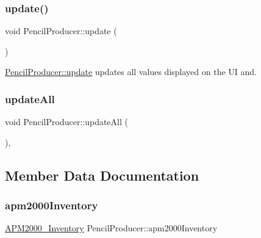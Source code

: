 \subsubsection{\texorpdfstring{update()}{update()}}
{\footnotesize\ttfamily void Pencil\+Producer\+::update (\begin{DoxyParamCaption}{ }\end{DoxyParamCaption})\hspace{0.3cm}{\ttfamily [private]}}



\mbox{\hyperlink{classPencilProducer_afcd36c151c55ad1c9024873050eaee4d}{Pencil\+Producer\+::update}} updates all values displayed on the UI and. 

\mbox{\label{classPencilProducer_af182bfe6656f6e068da6feb74afa0bec}} 
\subsubsection{\texorpdfstring{updateAll}{updateAll}}
{\footnotesize\ttfamily void Pencil\+Producer\+::update\+All (\begin{DoxyParamCaption}{ }\end{DoxyParamCaption})\hspace{0.3cm}{\ttfamily [private]}, {\ttfamily [slot]}}



\subsection{Member Data Documentation}
\mbox{\label{classPencilProducer_a6af6334d9d18c19f235411a4c5fafb46}} 
\subsubsection{\texorpdfstring{apm2000Inventory}{apm2000Inventory}}
{\footnotesize\ttfamily \mbox{\hyperlink{classAPM2000__Inventory}{A\+P\+M2000\+\_\+\+Inventory}} Pencil\+Producer\+::apm2000\+Inventory\hspace{0.3cm}{\ttfamily [private]}}

\mbox{\label{classPencilProducer_a04a8078a404418407a30a4175aaf890a}} 
